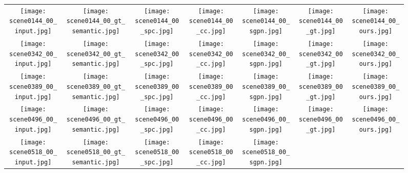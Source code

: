 \documentclass[10pt,twocolumn,letterpaper]{article}
\begin{document}
\begin{figure*}[ht!]
  \small
\centering
  \setlength{\tabcolsep}{0.4mm}
  \newcommand{\sz}{0.14}
  \newcommand{\lsp}{0mm}
  \begin{tabular}{ccccccc}
\texttt{[image: scene0144\_00\_input.jpg]} &
    \texttt{[image: scene0144\_00\_gt\_semantic.jpg]} & 
    \texttt{[image: scene0144\_00\_spc.jpg]} &
    \texttt{[image: scene0144\_00\_cc.jpg]} & 
    \texttt{[image: scene0144\_00\_sgpn.jpg]} & 
    \texttt{[image: scene0144\_00\_gt.jpg]} & 
    \texttt{[image: scene0144\_00\_ours.jpg]} \\[\lsp]
\texttt{[image: scene0342\_00\_input.jpg]} &
    \texttt{[image: scene0342\_00\_gt\_semantic.jpg]} & 
    \texttt{[image: scene0342\_00\_spc.jpg]} &
    \texttt{[image: scene0342\_00\_cc.jpg]} & 
    \texttt{[image: scene0342\_00\_sgpn.jpg]} & 
    \texttt{[image: scene0342\_00\_gt.jpg]} & 
    \texttt{[image: scene0342\_00\_ours.jpg]} \\[\lsp]
\texttt{[image: scene0389\_00\_input.jpg]} &
    \texttt{[image: scene0389\_00\_gt\_semantic.jpg]} & 
    \texttt{[image: scene0389\_00\_spc.jpg]} &
    \texttt{[image: scene0389\_00\_cc.jpg]} & 
    \texttt{[image: scene0389\_00\_sgpn.jpg]} & 
    \texttt{[image: scene0389\_00\_gt.jpg]} & 
    \texttt{[image: scene0389\_00\_ours.jpg]} \\[\lsp]
\texttt{[image: scene0496\_00\_input.jpg]} &
    \texttt{[image: scene0496\_00\_gt\_semantic.jpg]} & 
    \texttt{[image: scene0496\_00\_spc.jpg]} &
    \texttt{[image: scene0496\_00\_cc.jpg]} & 
    \texttt{[image: scene0496\_00\_sgpn.jpg]} & 
    \texttt{[image: scene0496\_00\_gt.jpg]} & 
    \texttt{[image: scene0496\_00\_ours.jpg]} \\[\lsp]
\texttt{[image: scene0518\_00\_input.jpg]} &
    \texttt{[image: scene0518\_00\_gt\_semantic.jpg]} & 
    \texttt{[image: scene0518\_00\_spc.jpg]} &
    \texttt{[image: scene0518\_00\_cc.jpg]} & 
    \texttt{[image: scene0518\_00\_sgpn.jpg]} & 

\end{tabular}
\end{figure*}
\end{document}
